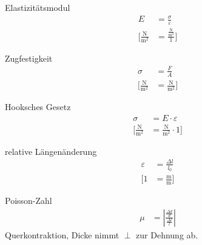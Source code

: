 %


\begin{karte}{Elastizitätsmodul}
   \begin{align*}
       E &= \frac{\sigma}{\varepsilon} \\
       \bigg[ \frac{\si{\newton}}{\si{\square\meter}} &= \frac{\frac{\si{\newton}}{\si{\square\meter}}}{1} \bigg]
   \end{align*}
\end{karte}

\begin{karte}{Zugfestigkeit}
   \begin{align*}
       \sigma &= \frac{F}{A} \\
       \bigg[ \frac{\si{\newton}}{\si{\square\meter}} &= \frac{\si{\newton}}{\si{\square\meter}} \bigg]
   \end{align*}
\end{karte}

\begin{karte}{Hooksches Gesetz}
   \begin{align*}
       \sigma &= E \cdot \varepsilon \\
       \bigg[ \frac{\si{\newton}}{\si{\square\meter}} &= \frac{\si{\newton}}{\si{\square\meter}} \cdot {1} \bigg]
   \end{align*}
\end{karte}

\begin{karte}{relative Längenänderung}
   \begin{align*}
       \varepsilon &= \frac{\Delta l}{l_0} \\
       \bigg[ 1 &= \frac{\si{\meter}}{\si{\meter}} \bigg]
   \end{align*}
\end{karte}

\begin{karte}{Poisson-Zahl}
   \begin{align*}
       \mu &=  \left| \frac{ \frac{\Delta d}{d} }{ \frac{\Delta l}{l} } \right|
   \end{align*}
   Querkontraktion, Dicke nimmt \(\perp\) zur Dehnung ab.
\end{karte}

